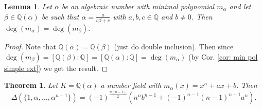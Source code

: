 \documentclass[11pt,a4paper]{report}
\theoremstyle{plain}
\newtheorem{thm}[subsection]{Theorem}
\newtheorem{lem}[subsection]{Lemma}
\theoremstyle{definition}
\theoremstyle{definition}
\def\QQ{\mathbb{Q}}
\def \a{\alpha}
\begin{document}
	\begin{lem}\label{lem: min pol of lin trans}
		Let $\a$ be an algebraic number with minimal polynomial $m_\a$ and let $\beta \in \QQ(\a)$ be such that $\a=\frac{a}{b\beta+c}$ with $a,b,c \in \QQ$ and $b \neq 0$. Then $\deg(m_\a)=\deg(m_\beta)$.
	\end{lem}
	
	\begin{proof}
		
		
		
		
		
		Note that $\QQ(\a)=\QQ(\beta)$ (just do double inclusion). Then since $\deg(m_\beta)=[\QQ(\beta):\QQ]=[\QQ(\a):\QQ]=\deg(m_\a)$  (by Cor. \ref{cor: min pol simple ext}) we get the result.       
		
	\end{proof}
	
	\begin{thm}\label{thm: disc of trinom}
		Let $K=\QQ(\a)$ a number field with $m_\a(x)=x^n+ax+b$. Then \[\Delta(\{1,\a,\dots,\a^{n-1}\})=(-1)^{\frac{n(n-1)}{2}}(n^nb^{n-1}+(-1)^{n-1}(n-1)^{n-1}a^n)   .\]
	\end{thm}
	
\end{document}
